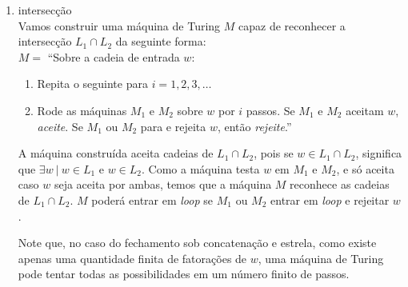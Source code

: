 \begin{enumerate}[label={\textbf{\alph*.}}]
    \item intersecção\\[3pt]
    Vamos construir uma máquina de Turing $M$ capaz de reconhecer a intersecção $L_1 \cap L_2$ da seguinte forma:\\[3pt]
    $M =$ “Sobre a cadeia de entrada $w$:
    \begin{enumerate}[label={\textbf{\arabic*.}}, leftmargin=1in]
        \item Repita o seguinte para $i = 1, 2, 3, \ldots$
    
        \item Rode as máquinas $M_1$ e $M_2$ sobre $w$ por $i$ passos. Se $M_1$ e $M_2$ aceitam $w$, \textit{aceite}. Se $M_1$ ou $M_2$ para e rejeita $w$, então \textit{rejeite}.”
    \end{enumerate}
    
    A máquina construída aceita cadeias de $L_1 \cap L_2$, pois se $w \in L_1 \cap L_2$, significa que $\exists w \ |\ w \in L_1$ e $w \in L_2$. Como a máquina testa $w$ em $M_1$ e $M_2$, e só aceita caso $w$ seja aceita por ambas, temos que a máquina $M$ reconhece as cadeias de $L_1 \cap L_2$. $M$ poderá entrar em \textit{loop} se $M_1$ ou $M_2$ entrar em \textit{loop} e rejeitar $w$.
    
    Note que, no caso do fechamento sob concatenação e estrela, como existe apenas uma quantidade finita de fatorações de $w$, uma máquina de Turing pode tentar todas as possibilidades em um número finito de passos.
\end{enumerate}